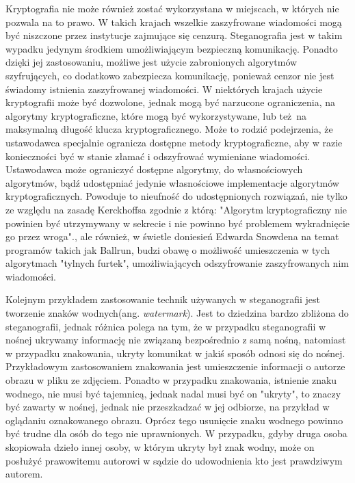 \documentclass[a4paper, twoside]{report}
\begin{document}
        Kryptografia nie może również zostać wykorzystana w miejscach, w których
        nie pozwala na to prawo.\cite{CRYPTOGRAFYLAW} W takich krajach wszelkie
        zaszyfrowane wiadomości mogą być niszczone przez instytucje zajmujące się
        cenzurą. Steganografia jest w takim
        wypadku jedynym środkiem umożliwiającym bezpieczną komunikację. Ponadto
        dzięki jej zastosowaniu, możliwe jest użycie zabronionych algorytmów szyfrujących,
        co dodatkowo zabezpiecza komunikację, ponieważ cenzor nie jest świadomy
        istnienia zaszyfrowanej wiadomości. W niektórych krajach użycie kryptografii
        może być dozwolone, jednak mogą być narzucone ograniczenia, na algorytmy
        kryptograficzne, które mogą być wykorzystywane, lub też na maksymalną
        długość klucza kryptograficznego. Może to rodzić podejrzenia, że ustawodawca
        specjalnie ogranicza dostępne metody kryptograficzne, aby w razie konieczności
        być w stanie złamać i odszyfrować wymieniane wiadomości. Ustawodawca
        może ograniczyć dostępne algorytmy, do własnościowych algorytmów, bądź
        udostępniać jedynie własnościowe implementacje algorytmów kryptograficznych.
        Powoduje to nieufność do udostępnionych rozwiązań, nie tylko ze względu
        na zasadę Kerckhoffsa zgodnie z którą:
        "Algorytm kryptograficzny nie powinien być utrzymywany w sekrecie i nie powinno
        być problemem wykradnięcie go przez wroga".\cite{KERCKHOS}, ale również,
        w świetle doniesień Edwarda Snowdena na temat programów takich jak
        Ballrun\cite{WIKI:BALLRUN}, budzi obawę o możliwość umieszczenia w tych
        algorytmach "tylnych furtek", umożliwiających odszyfrowanie zaszyfrowanych
        nim wiadomości.

        Kolejnym przykładem zastosowanie technik używanych w steganografii jest
        tworzenie znaków wodnych(ang. \emph{watermark}). Jest to dziedzina bardzo zbliżona do steganografii,
        jednak różnica polega na tym, że w przypadku steganografii w nośnej ukrywamy
        informację nie związaną bezpośrednio z samą nośną, natomiast w przypadku znakowania,
        ukryty komunikat w jakiś sposób odnosi się do nośnej. Przykładowym zastosowaniem
        znakowania jest umieszczenie informacji o autorze obrazu w pliku ze zdjęciem.
        Ponadto w przypadku znakowania, istnienie znaku wodnego, nie musi być tajemnicą,
        jednak nadal musi być on "ukryty", to znaczy być zawarty w nośnej, jednak
        nie przeszkadzać w jej odbiorze, na przykład w oglądaniu oznakowanego obrazu.
        Oprócz tego usunięcie znaku wodnego powinno być trudne dla osób do tego nie
        uprawnionych. W przypadku, gdyby druga osoba skopiowała dzieło innej osoby,
        w którym ukryty był znak wodny, może on posłużyć prawowitemu autorowi w
        sądzie do udowodnienia kto jest prawdziwym autorem.
\end{document}
